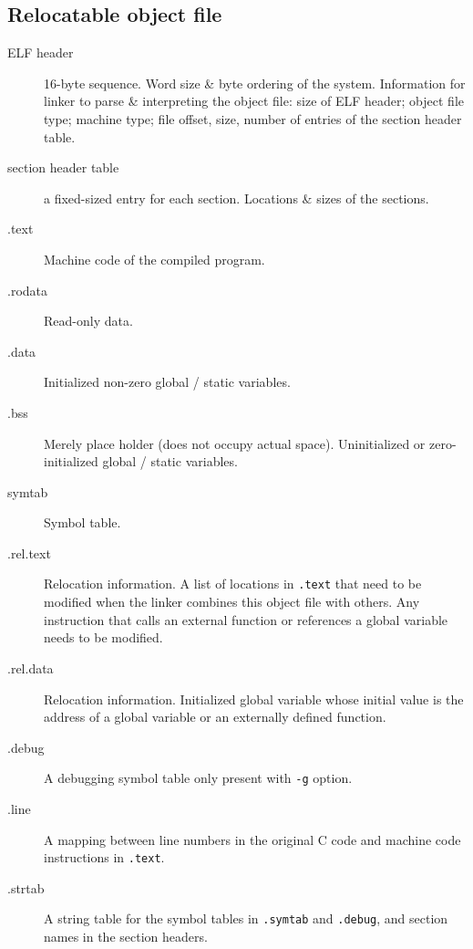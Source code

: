 \subsection{Relocatable object file}
\begin{description}
\item[ELF header]16-byte sequence. Word size \& byte ordering of the system. Information for linker to parse \& interpreting the object file: size of ELF header; object file type; machine type; file offset, size, number of entries of the section header table.
\item[section header table] a fixed-sized entry for each section. Locations \& sizes of the sections.
\item[.text]Machine code of the compiled program.
\item[.rodata]Read-only data.
\item[.data]Initialized non-zero global / static variables.
\item[.bss] Merely place holder (does not occupy actual space). Uninitialized or zero-initialized global / static variables.
\item[symtab]Symbol table.
\item[.rel.text]Relocation information. A list of locations in \texttt{.text} that need to be modified when the linker combines this object file with others. Any instruction that calls an external function or references a global variable needs to be modified.
\item[.rel.data]Relocation information. Initialized global variable whose initial value is the address of a global variable or an externally defined function.
\item[.debug]A debugging symbol table only present with \texttt{-g} option.
\item[.line]A mapping between line numbers in the original C code and machine code instructions in \texttt{.text}.
\item[.strtab]A string table for the symbol tables in \texttt{.symtab} and \texttt{.debug}, and section names in the section headers.
\end{description}


